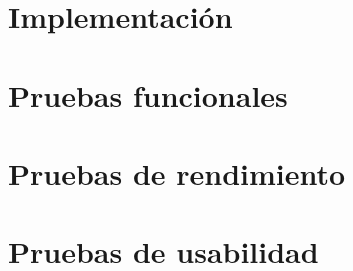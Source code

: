 \section{Implementación}


\section{Pruebas funcionales}


\section{Pruebas de rendimiento}


\section{Pruebas de usabilidad}
